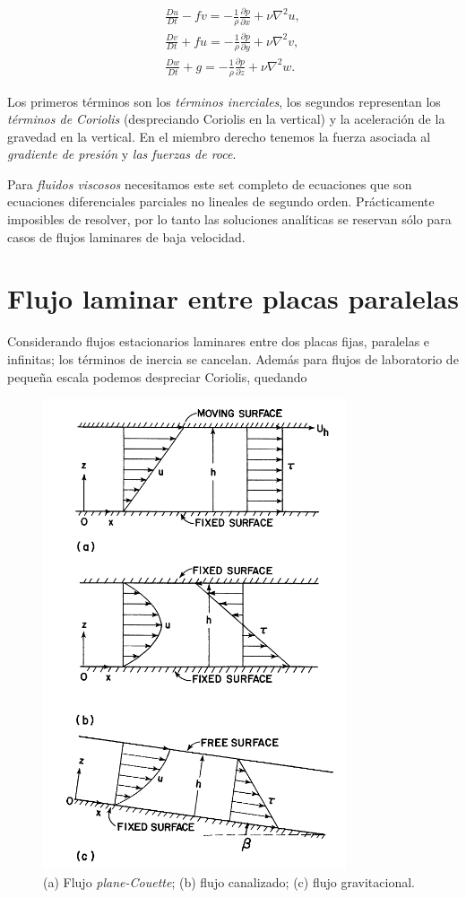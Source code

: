 \documentclass[openany]{book}
\begin{document}
\begin{gather}
   \frac{Du}{Dt}-fv=-\frac{1}{\rho}\frac{\partial p}{\partial x}+\nu\nabla^{2}u,\\
   \frac{Dv}{Dt}+fu=-\frac{1}{\rho}\frac{\partial p}{\partial y}+\nu\nabla^{2}v,\\
   \frac{Dw}{Dt}+g=-\frac{1}{\rho}\frac{\partial p}{\partial z}+\nu\nabla^{2}w.
\end{gather}

\par Los primeros términos son los \emph{términos inerciales},
 los segundos representan los \emph{términos de Coriolis} 
 (despreciando Coriolis en la vertical) y la aceleración de la 
 gravedad en la vertical. En el miembro derecho tenemos la 
 fuerza asociada al \emph{gradiente de presión} y \emph{las 
 fuerzas de roce}.

\par Para \emph{fluidos viscosos} necesitamos este set completo de 
ecuaciones que son ecuaciones diferenciales parciales no lineales de 
segundo orden. Prácticamente imposibles de resolver, por lo tanto las 
soluciones analíticas se reservan sólo para casos de flujos laminares 
de baja velocidad.

\section{Flujo laminar entre placas paralelas}
Considerando flujos estacionarios laminares entre dos placas
fijas, paralelas e infinitas; los términos de inercia se cancelan. Además 
para flujos de laboratorio de pequeña escala podemos despreciar
Coriolis, quedando

\begin{figure}[htb]
    \centering
    \includegraphics[width=0.6\linewidth]{img/laminar-fluxes.png}
    \caption{(a) Flujo \emph{plane-Couette}; (b) flujo canalizado;
    (c) flujo gravitacional.}
    \label{fig:laminar-flows}
\end{figure}
\end{document}
